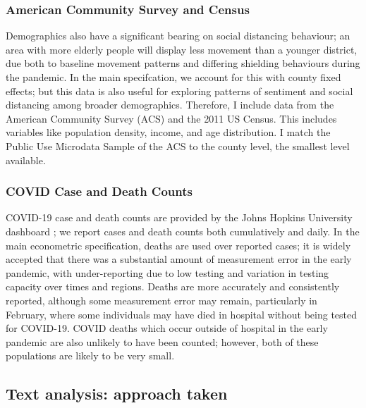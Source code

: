 \documentclass{article}
\begin{document}
\subsubsection{American Community Survey and Census}
Demographics also have a significant bearing on social distancing behaviour; an area with more elderly people will display less movement than a younger district, due both to baseline movement patterns and differing shielding behaviours during the pandemic. In the main specifcation, we account for this with county fixed effects; but this data is also useful for exploring patterns of sentiment and social distancing among broader demographics. Therefore, I include data from the American Community Survey (ACS) and the 2011 US Census. This includes variables like population density, income, and age distribution. I match the Public Use Microdata Sample of the ACS to the county level, the smallest level available. 

\subsubsection{COVID Case and Death Counts}
COVID-19 case and death counts are provided by the Johns Hopkins University dashboard \textcite{dongInteractiveWebbasedDashboard2020}; we report cases and death counts both cumulatively and daily. In the main econometric specification, deaths are used over reported cases; it is widely accepted that there was a substantial amount of measurement error in the early pandemic, with under-reporting due to low testing and variation in testing capacity over times and regions. Deaths are more accurately and consistently reported, although some measurement error may remain, particularly in February, where some individuals may have died in hospital without being tested for COVID-19. COVID deaths which occur outside of hospital in the early pandemic are also unlikely to have been counted; however, both of these populations are likely to be very small. 

\subsection{Text analysis: approach taken}\label{approach}
\end{document}
